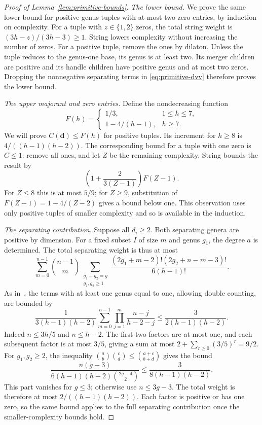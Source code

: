 \begin{proof}[Proof of Lemma~\ref{lem:primitive-bounds}]
\emph{The lower bound.}
We prove the same lower bound for positive-genus tuples with at most two
zero entries, by induction on complexity. For a tuple with $z\in\{1,2\}$
zeros, the total string weight is $(3h-z)/(3h-3)\ge1$.
String lowers complexity without increasing the number of zeros.
For a positive tuple, remove the ones by dilaton. Unless the tuple
reduces to the genus-one base, its genus is at least two. Its merger
children are positive and its handle children have positive genus and
at most two zeros. Dropping the nonnegative separating terms in
\eqref{eq:primitive-dvv} therefore proves the lower bound.

\emph{The upper majorant and zero entries.}
Define the nondecreasing function
\[
 F(h)=\begin{cases}1/3,&1\le h\le7,\\
                   1-4/(h-1),&h\ge7.
       \end{cases}
\]
We will prove $C(\mathbf d)\le F(h)$ for positive tuples.
Its increment for $h\ge8$ is $4/((h-1)(h-2))$.
The corresponding bound for a tuple with one zero is $C\le1$:
remove all ones, and let $Z$ be the remaining complexity. String bounds
the result by
\[
 \left(1+\frac{2}{3(Z-1)}\right)F(Z-1).
\]
For $Z\le8$ this is at most $5/9$; for $Z\ge9$, substitution of
$F(Z-1)=1-4/(Z-2)$ gives a bound below one. This observation uses only
positive tuples of smaller complexity and so is available in the induction.

\emph{The separating contribution.}
Suppose all $d_i\ge2$. Both separating genera are positive by dimension.
For a fixed subset $I$ of size $m$ and genus $g_1$, the degree $a$ is
determined. The total separating weight is thus at most
\[
 \sum_{m=0}^{n-1}\binom{n-1}{m}
 \sum_{\substack{g_1+g_2=g\\g_1,g_2\ge1}}
 \frac{(2g_1+m-2)!(2g_2+n-m-3)!}{6(h-1)!}.
\]
As in~\cite[Lemma~3]{GYZ}, the terms with at least one genus equal to
one, allowing double counting, are bounded by
\[
 \frac{1}{3(h-1)(h-2)}
 \sum_{m=0}^{n-1}\prod_{j=1}^m\frac{n-j}{h-2-j}
 \le\frac{3}{2(h-1)(h-2)}.
\]
Indeed $n\le3h/5$ and $n\le h-2$. The first two factors are at most
one, and each subsequent factor is at most $3/5$, giving a sum at most
$2+\sum_{r\ge0}(3/5)^r=9/2$.
For $g_1,g_2\ge2$, the inequality
$\binom ab\binom cd\le\binom{a+c}{b+d}$ gives the bound
\[
 \frac{n(g-3)}{6(h-1)(h-2)\binom{2g-4}{2}}
 \le\frac{3}{8(h-1)(h-2)}.
\]
This part vanishes for $g\le3$; otherwise use $n\le3g-3$.
The total weight is therefore at most $2/((h-1)(h-2))$.
Each factor is positive or has one zero, so the same bound applies to
the full separating contribution once the smaller-complexity bounds hold.


\end{proof}
